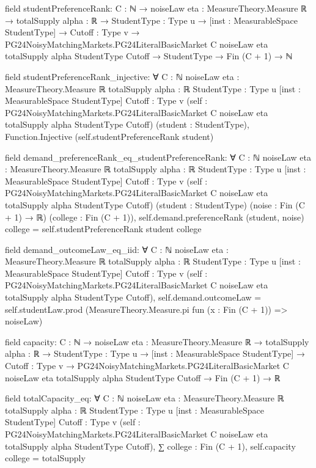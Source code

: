 \documentclass[10pt]{article}
\begin{document}
\begin{ReviewVerbatim}
field studentPreferenceRank:
{C : ℕ} →
  {noiseLaw eta : MeasureTheory.Measure ℝ} →
    {totalSupply alpha : ℝ} →
      {StudentType : Type u} →
        [inst : MeasurableSpace StudentType] →
          {Cutoff : Type v} →
            PG24NoisyMatchingMarkets.PG24LiteralBasicMarket C noiseLaw eta totalSupply alpha StudentType Cutoff →
              StudentType → Fin (C + 1) → ℕ

field studentPreferenceRank_injective:
∀ {C : ℕ} {noiseLaw eta : MeasureTheory.Measure ℝ} {totalSupply alpha : ℝ} {StudentType : Type u}
  [inst : MeasurableSpace StudentType] {Cutoff : Type v}
  (self : PG24NoisyMatchingMarkets.PG24LiteralBasicMarket C noiseLaw eta totalSupply alpha StudentType Cutoff)
  (student : StudentType), Function.Injective (self.studentPreferenceRank student)

field demand_preferenceRank_eq_studentPreferenceRank:
∀ {C : ℕ} {noiseLaw eta : MeasureTheory.Measure ℝ} {totalSupply alpha : ℝ} {StudentType : Type u}
  [inst : MeasurableSpace StudentType] {Cutoff : Type v}
  (self : PG24NoisyMatchingMarkets.PG24LiteralBasicMarket C noiseLaw eta totalSupply alpha StudentType Cutoff)
  (student : StudentType) (noise : Fin (C + 1) → ℝ) (college : Fin (C + 1)),
  self.demand.preferenceRank (student, noise) college = self.studentPreferenceRank student college

field demand_outcomeLaw_eq_iid:
∀ {C : ℕ} {noiseLaw eta : MeasureTheory.Measure ℝ} {totalSupply alpha : ℝ} {StudentType : Type u}
  [inst : MeasurableSpace StudentType] {Cutoff : Type v}
  (self : PG24NoisyMatchingMarkets.PG24LiteralBasicMarket C noiseLaw eta totalSupply alpha StudentType Cutoff),
  self.demand.outcomeLaw = self.studentLaw.prod (MeasureTheory.Measure.pi fun (x : Fin (C + 1)) => noiseLaw)

field capacity:
{C : ℕ} →
  {noiseLaw eta : MeasureTheory.Measure ℝ} →
    {totalSupply alpha : ℝ} →
      {StudentType : Type u} →
        [inst : MeasurableSpace StudentType] →
          {Cutoff : Type v} →
            PG24NoisyMatchingMarkets.PG24LiteralBasicMarket C noiseLaw eta totalSupply alpha StudentType Cutoff →
              Fin (C + 1) → ℝ

field totalCapacity_eq:
∀ {C : ℕ} {noiseLaw eta : MeasureTheory.Measure ℝ} {totalSupply alpha : ℝ} {StudentType : Type u}
  [inst : MeasurableSpace StudentType] {Cutoff : Type v}
  (self : PG24NoisyMatchingMarkets.PG24LiteralBasicMarket C noiseLaw eta totalSupply alpha StudentType Cutoff),
  ∑ college : Fin (C + 1), self.capacity college = totalSupply


\end{ReviewVerbatim}
\end{document}
